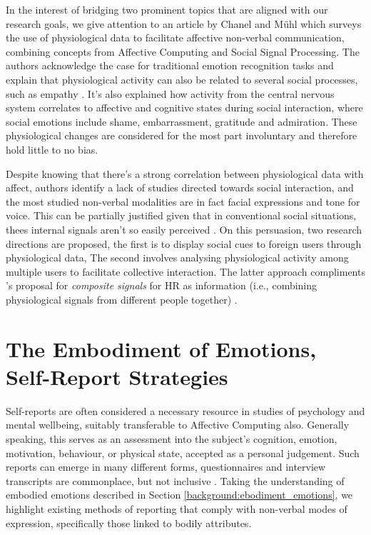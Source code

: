 In the interest of bridging two prominent topics that are aligned with our research goals, we give attention to an article by Chanel and Mühl \cite{chanel_connecting_2015} which surveys the use of physiological data to facilitate affective non-verbal communication, combining concepts from Affective Computing and Social Signal Processing. The authors acknowledge the case for traditional emotion recognition tasks and explain that physiological activity can also be related to several social processes, such as empathy \cite{levenson_empathy_1992}. It's also explained how activity from the central nervous system correlates to affective and cognitive states during social interaction, where social emotions include shame, embarrassment, gratitude and admiration. These physiological changes are considered for the most part involuntary and therefore hold little to no bias.

Despite knowing that there's a strong correlation between physiological data with affect, authors identify a lack of studies directed towards social interaction, and the most studied non-verbal modalities are in fact facial expressions and tone for voice. This can be partially justified given that in conventional social situations, thees internal signals aren't so easily perceived \cite{vinciarelli_social_2009}. On this persuasion, two research directions are proposed, the first is to display social cues to foreign users through physiological data, The second involves analysing physiological activity among multiple users to facilitate collective interaction. The latter approach compliments \citeauthor{slovak_understanding_2012}'s proposal for \textit{composite signals} for HR as information (i.e., combining physiological signals from different people together) \cite{slovak_understanding_2012}.

\section{The Embodiment of Emotions, Self-Report Strategies}

Self-reports are often considered a necessary resource in studies of psychology and mental wellbeing, suitably transferable to Affective Computing also. Generally speaking, this serves as an assessment into the subject's cognition, emotion, motivation, behaviour, or physical state, accepted as a personal judgement. Such reports can emerge in many different forms, questionnaires and interview transcripts are commonplace, but not inclusive \cite{barker_self-report_2016}. Taking the understanding of embodied emotions described in Section \ref{background:ebodiment_emotions}, we highlight existing methods of reporting that comply with non-verbal modes of expression, specifically those linked to bodily attributes.

